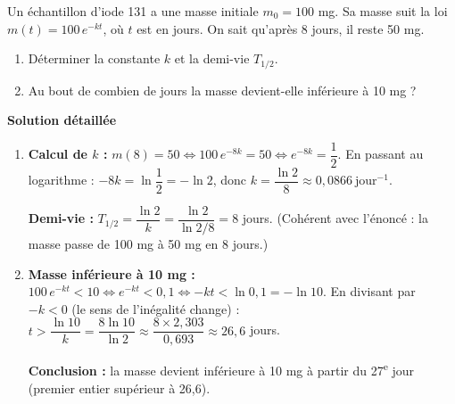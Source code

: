 \documentclass[11pt]{article}
\begin{document}
\begin{exoresolu}
Un échantillon d'iode 131 a une masse initiale $m_0 = 100$ mg. Sa masse suit la loi $m(t) = 100\, e^{-kt}$, où $t$ est en jours. On sait qu'après 8 jours, il reste 50 mg.
\begin{enumerate}
    \item Déterminer la constante $k$ et la demi-vie $T_{1/2}$.
    \item Au bout de combien de jours la masse devient-elle inférieure à 10 mg ?
\end{enumerate}
\tcblower
\textbf{Solution détaillée}
\begin{enumerate}
    \item \textbf{Calcul de $k$ :} $m(8) = 50 \iff 100\, e^{-8k} = 50 \iff e^{-8k} = \dfrac12$.
    En passant au logarithme : $-8k = \ln\dfrac12 = -\ln 2$, donc $k = \dfrac{\ln 2}{8} \approx 0,0866\ \text{jour}^{-1}$.

    \textbf{Demi-vie :} $T_{1/2} = \dfrac{\ln 2}{k} = \dfrac{\ln 2}{\ln 2 / 8} = 8$ jours. (Cohérent avec l'énoncé : la masse passe de 100 mg à 50 mg en 8 jours.)
    \item \textbf{Masse inférieure à 10 mg :} $100\, e^{-kt} < 10 \iff e^{-kt} < 0,1 \iff -kt < \ln 0,1 = -\ln 10$.
    En divisant par $-k < 0$ (le sens de l'inégalité change) : $t > \dfrac{\ln 10}{k} = \dfrac{8\ln 10}{\ln 2} \approx \dfrac{8\times 2,303}{0,693} \approx 26,6$ jours.

    \textbf{Conclusion :} la masse devient inférieure à 10 mg à partir du 27\textsuperscript{e} jour (premier entier supérieur à 26,6).
\end{enumerate}
\end{exoresolu}
\end{document}
